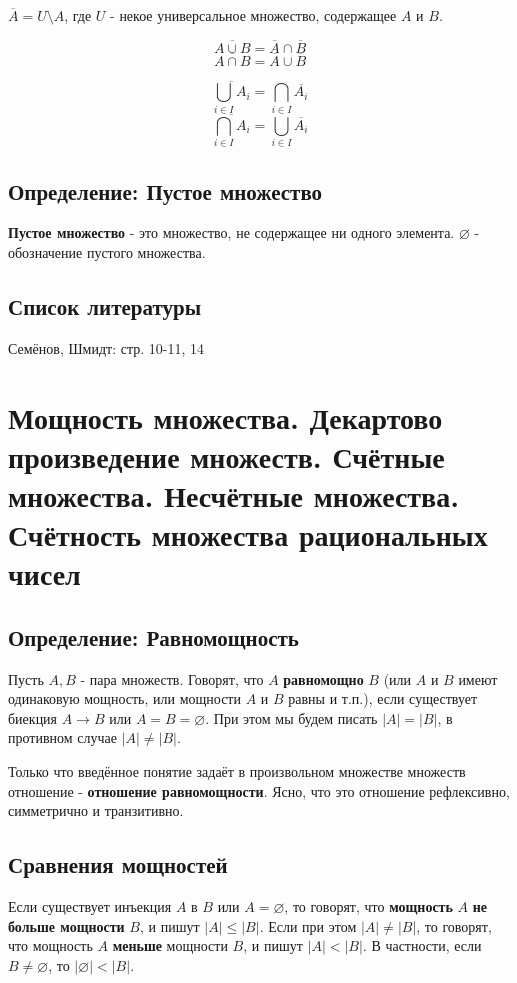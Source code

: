 \documentclass{article}
\begin{document}
$\overline A = U \setminus A$, где $U$ - некое универсальное множество, содержащее $A$ и $B$.

\[\overline{A \cup B} = \overline A \cap \overline B \]
\[\overline{A \cap B} = \overline A \cup \overline B \]

\[\overline{\bigcup_{i\in I} A_i} = \bigcap_{i\in I}\overline{A_i}\]
\[\overline{\bigcap_{i\in I} A_i} = \bigcup_{i\in I}\overline{A_i}\]

\subsection{Определение: Пустое множество}
\textbf{Пустое множество} - это множество, не содержащее ни одного элемента. $\varnothing$ - обозначение пустого множества.

\subsection*{Список литературы}
Семёнов, Шмидт: стр. 10-11, 14

\newpage
\section{Мощность множества. Декартово произведение множеств. Счётные множества. Несчётные множества. Счётность множества рациональных чисел}

\subsection{Определение: Равномощность}

Пусть $A, B$ - пара множеств. Говорят, что $A$ \textbf{равномощно} $B$ (или $A$ и $B$ имеют одинаковую мощность, или мощности $A$ и $B$ равны и т.п.), если существует биекция $A \rightarrow B$ или $A = B = \varnothing$. При этом мы будем писать $|A| = |B|$, в противном случае $|A|\neq|B|$.

Только что введённое понятие задаёт в произвольном множестве множеств отношение - \textbf{отношение равномощности}. Ясно, что это отношение рефлексивно, симметрично и транзитивно.

\subsection{Сравнения мощностей}

Если существует инъекция $A$ в $B$ или $A = \varnothing$, то говорят, что \textbf{мощность} $A$ \textbf{не больше мощности} $B$, и пишут $|A| \leq |B|$. Если при этом $|A| \neq |B|$, то говорят, что мощность $A$ \textbf{меньше} мощности $B$, и пишут $|A| < |B|$. В частности, если $B \neq \varnothing$, то $|\varnothing| < |B|$.
\end{document}
